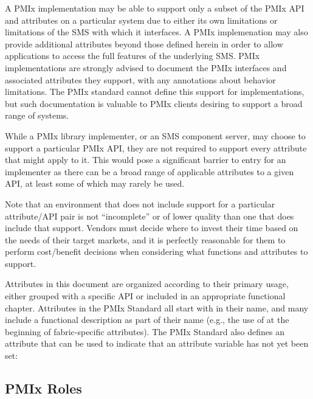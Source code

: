 A \ac{PMIx} implementation may be able to support only a subset of the \ac{PMIx} \acs{API} and attributes on
a particular system due to either its own limitations or limitations of the \ac{SMS} with which it interfaces.
A \ac{PMIx} implemenation may also provide additional attributes beyond those defined herein in order to allow
applications to access the full features of the underlying \ac{SMS}.
\ac{PMIx} implementations are strongly advised to document the \ac{PMIx} interfaces and associated attributes they support, with any annotations about behavior limitations.
The \ac{PMIx} standard cannot define this support for implementations, but such documentation is valuable to \ac{PMIx} clients desiring to support a broad range of systems.

While a \ac{PMIx} library implementer, or an \ac{SMS} component server, may choose to support a particular \ac{PMIx} \ac{API}, they are not required to support every attribute that might apply to it. This would pose a significant barrier to entry for an implementer as there can be a broad range of applicable attributes to a given \ac{API}, at least some of which may rarely be used.

Note that an environment that does not include support for a particular attribute/\ac{API} pair is not ``incomplete'' or of lower quality than one that does include that support. Vendors must decide where to invest their time based on the needs of their target markets, and it is perfectly reasonable for them to perform cost/benefit decisions when considering what functions and attributes to support.


Attributes in this document are organized according to their primary usage, either grouped with a specific \ac{API} or included in an appropriate functional chapter. Attributes in the \ac{PMIx} Standard all start with  in their name, and many include a functional description as part of their name (e.g., the use of  at the beginning of fabric-specific attributes). The \ac{PMIx} Standard also defines an attribute that can be used to indicate that an attribute variable has not yet been set:


\subsection{PMIx Roles}

